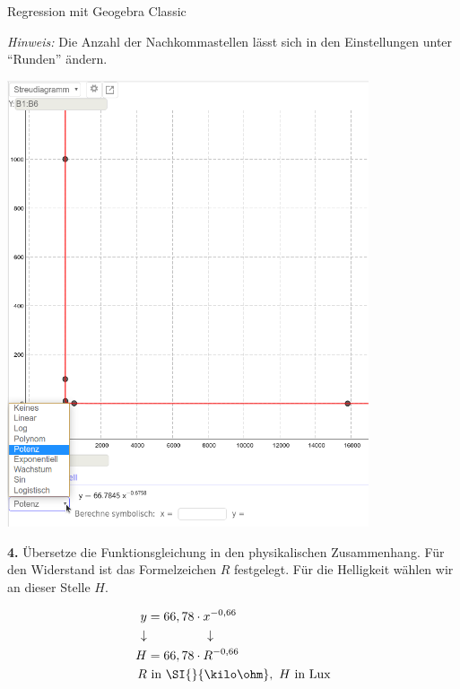 \begin{zsfg}{Regression mit Geogebra Classic}
\begin{minipage}[c][7.5cm][t]{0.48\textwidth}
		\emph{Hinweis:} Die Anzahl der Nachkommastellen lässt sich in den Einstellungen unter \enquote{Runden} ändern.
	\end{minipage}
	\hfill
	\begin{minipage}[c][7.5cm][t]{0.48\textwidth}
		\centering
		\includegraphics[width=0.8\textwidth]{./pics/RegressionLDR-GGB-3.png}
	\end{minipage}
	
	\begin{minipage}[c][3cm][t]{0.48\textwidth}
		\textbf{4.} Übersetze die Funktionsgleichung in den physikalischen Zusammenhang. Für den Widerstand ist das Formelzeichen $R$ festgelegt. Für die Helligkeit wählen wir an dieser Stelle $H$.
	\end{minipage}
	\hfill
	\begin{minipage}[c][3cm][t]{0.48\textwidth}
		\centering
		\vspace{-\baselineskip}
		\begin{align*}
		y &= 66,78 \cdot x^{-0,66} \\
		\downarrow & \hspace{1.6cm}\downarrow \\
		H &= 66,78 \cdot R^{-0,66} \\
		R &\text{ in } \SI{}{\kilo\ohm}, ~ H \text{ in Lux} 
		\end{align*}
	\end{minipage}
\end{zsfg}
\vfill


